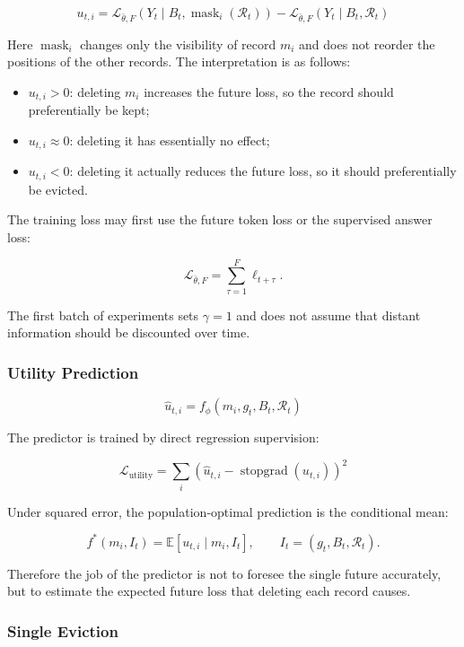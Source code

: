 \[
\boxed{
u_{t,i} =
\mathcal L_{\bar\theta,F}
\left(
Y_t\mid B_t,\operatorname{mask}_i(\mathcal R_t)
\right) -
\mathcal L_{\bar\theta,F}
\left(
Y_t\mid B_t,\mathcal R_t
\right)
}
\]

Here $\operatorname{mask}_i$ changes only the visibility of record $m_i$ and does not reorder the positions of the other records. The interpretation is as follows:

\begin{itemize}
  \item $u_{t,i}> 0$: deleting $m_i$ increases the future loss, so the record should preferentially be kept;
  \item $u_{t,i}\approx0$: deleting it has essentially no effect;
  \item $u_{t,i}< 0$: deleting it actually reduces the future loss, so it should preferentially be evicted.
\end{itemize}

The training loss may first use the future token loss or the supervised answer loss:

\[
\mathcal L_{\bar\theta,F} =
\sum_{\tau=1}^{F}\ell_{t+\tau}.
\]

The first batch of experiments sets $\gamma=1$ and does not assume that distant information should be discounted over time.

\subsubsection{Utility Prediction}

\[
\boxed{
\hat u_{t,i} =
f_\phi
\left(
m_i,g_t,B_t,\mathcal R_t
\right)
}
\]

The predictor is trained by direct regression supervision:

\[
\boxed{
\mathcal L_{\operatorname{utility}} =
\sum_i
\left(
\hat u_{t,i}
-\operatorname{stopgrad}(u_{t,i})
\right)^2
}
\]

Under squared error, the population-optimal prediction is the conditional mean:

\[
f^*(m_i,I_t) =
\mathbb E[u_{t,i}\mid m_i,I_t],
\qquad
I_t=(g_t,B_t,\mathcal R_t).
\]

Therefore the job of the predictor is not to foresee the single future accurately, but to estimate the expected future loss that deleting each record causes.

\subsubsection{Single Eviction}

